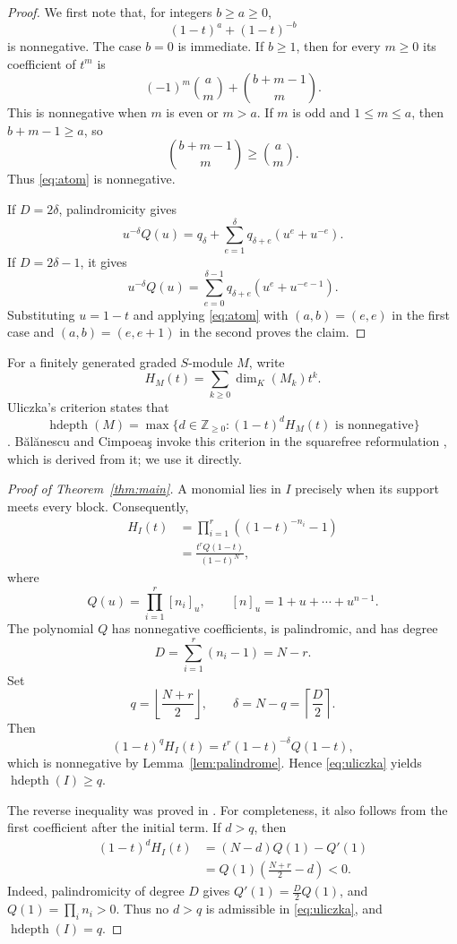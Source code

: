 \documentclass[11pt]{amsart}
\newcommand{\hdepth}{\operatorname{hdepth}}
\newcommand{\NN}{\mathbb{Z}_{\ge 0}}
\begin{document}
\begin{proof}
We first note that, for integers $b\ge a\ge0$,
\begin{equation}\label{eq:atom}
(1-t)^a+(1-t)^{-b}
\end{equation}
is nonnegative. The case $b=0$ is immediate. If $b\ge1$, then for every
$m\ge0$ its coefficient of $t^m$ is
\[
(-1)^m\binom{a}{m}+\binom{b+m-1}{m}.
\]
This is nonnegative when $m$ is even or $m>a$. If $m$ is odd and
$1\le m\le a$, then $b+m-1\ge a$, so
\[
\binom{b+m-1}{m}\ge\binom{a}{m}.
\]
Thus \eqref{eq:atom} is nonnegative.

If $D=2\delta$, palindromicity gives
\[
u^{-\delta}Q(u)
=q_{\delta}+\sum_{e=1}^{\delta}q_{\delta+e}
  (u^e+u^{-e}).
\]
If $D=2\delta-1$, it gives
\[
u^{-\delta}Q(u)
=\sum_{e=0}^{\delta-1}q_{\delta+e}
  (u^e+u^{-e-1}).
\]
Substituting $u=1-t$ and applying \eqref{eq:atom} with
$(a,b)=(e,e)$ in the first case and $(a,b)=(e,e+1)$ in the second proves
the claim.
\end{proof}

For a finitely generated graded $S$-module $M$, write
\[
H_M(t)=\sum_{k\ge0}\dim_K(M_k)t^k.
\]
Uliczka's criterion states that
\begin{equation}\label{eq:uliczka}
\hdepth(M)
=\max\bigl\{d\in\NN:(1-t)^dH_M(t)
\text{ is nonnegative}\bigr\}
\end{equation}
\cite[Theorem~3.2]{Uliczka}. B\u{a}l\u{a}nescu and Cimpoea\c{s} invoke this
criterion in the squarefree reformulation \cite[Theorem~2.4]{BCK}, which is
derived from it; we use it directly.

\begin{proof}[Proof of Theorem~\ref{thm:main}]
A monomial lies in $I$ precisely when its support meets every block.
Consequently,
\begin{align*}
H_I(t)
&=\prod_{i=1}^{r}\left((1-t)^{-n_i}-1\right)\\
&=\frac{t^rQ(1-t)}{(1-t)^N},
\end{align*}
where
\[
Q(u)=\prod_{i=1}^{r}[n_i]_u,
\qquad
[n]_u=1+u+\cdots+u^{n-1}.
\]
The polynomial $Q$ has nonnegative coefficients, is palindromic, and has
degree
\[
D=\sum_{i=1}^{r}(n_i-1)=N-r.
\]
Set
\[
q=\left\lfloor\frac{N+r}{2}\right\rfloor,
\qquad
\delta=N-q=\left\lceil\frac{D}{2}\right\rceil.
\]
Then
\[
(1-t)^qH_I(t)
=t^r(1-t)^{-\delta}Q(1-t),
\]
which is nonnegative by Lemma~\ref{lem:palindrome}. Hence
\eqref{eq:uliczka} yields $\hdepth(I)\ge q$.

The reverse inequality was proved in \cite[Theorem~3.3]{BC}. For
completeness, it also follows from the first coefficient after the
initial term. If $d>q$, then
\begin{align*}
[t^{r+1}](1-t)^dH_I(t)
&=(N-d)Q(1)-Q'(1)\\
&=Q(1)\left(\frac{N+r}{2}-d\right)<0.
\end{align*}
Indeed, palindromicity of degree $D$ gives
$Q'(1)=\frac{D}{2}Q(1)$, and $Q(1)=\prod_i n_i>0$. Thus no $d>q$ is
admissible in \eqref{eq:uliczka}, and $\hdepth(I)=q$.
\end{proof}
\end{document}
